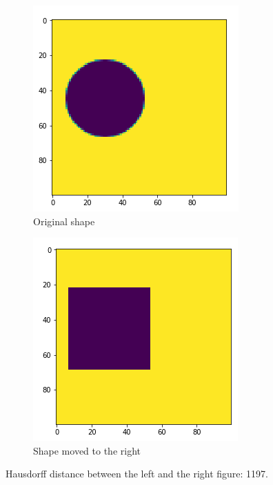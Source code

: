 \begin{figure}[H]
    \centering
    \begin{subfigure}{.5\textwidth}
        \centering
        \includegraphics[width=.75\linewidth]{chapters/06_hdm/images/hdm_original.png}
        \caption{Original shape}
    \end{subfigure}%
    \begin{subfigure}{.5\textwidth}
        \centering
        \includegraphics[width=.75\linewidth]{chapters/06_hdm/images/hdm_square.png}
        \caption{Shape moved to the right}
    \end{subfigure}
    \caption{Hausdorff distance between the left and the right figure: 1197. }
    \label{hdm_square}
\end{figure}


